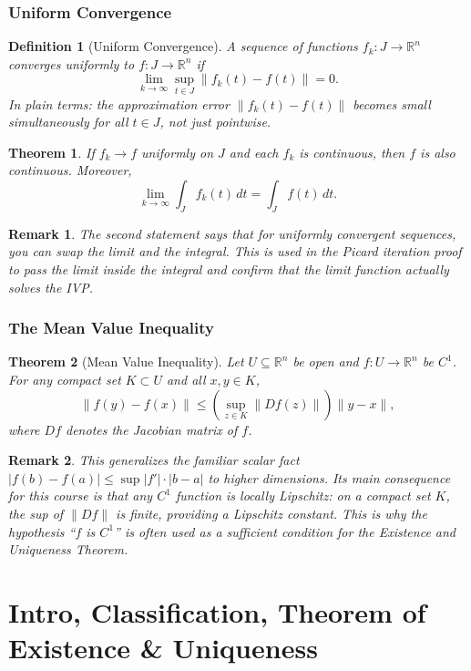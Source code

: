 \documentclass{article}
\newtheorem{theorem}{Theorem}
\newtheorem{definition}{Definition}
\newtheorem{remark}{Remark}
\newcommand{\R}{\mathbb{R}}
\begin{document}
\subsubsection{Uniform Convergence}
\begin{definition}[Uniform Convergence]
    A sequence of functions $f_k : J \to \R^n$ converges 
    \emph{uniformly} to $f : J \to \R^n$ if
    \[\lim_{k \to \infty} \sup_{t \in J} \|f_k(t) - f(t)\| = 0.\]
    In plain terms: the approximation error $\|f_k(t) - f(t)\|$ becomes 
    small \emph{simultaneously} for all $t \in J$, not just pointwise.
\end{definition}
\begin{theorem}
    If $f_k \to f$ uniformly on $J$ and each $f_k$ is continuous, then $f$ 
    is also continuous. Moreover,
    \[\lim_{k\to\infty}\int_J f_k(t)\,dt = \int_J f(t)\,dt.\]
\end{theorem}
\begin{remark}
    The second statement says that for uniformly convergent sequences, 
    you can swap the limit and the integral. This is used in the Picard 
    iteration proof to pass the limit inside the integral and confirm that 
    the limit function actually solves the IVP.
\end{remark}

\subsubsection{The Mean Value Inequality}
\label{MVI}
\begin{theorem}[Mean Value Inequality]
    Let $U \subseteq \R^n$ be open and $f : U \to \R^n$ 
    be $C^1$. For any compact set $K \subset U$ and all $x, y \in K$,
    \[\|f(y) - f(x)\| \leq \left(\sup_{z \in K}\|Df(z)\|\right)\|y - x\|,\]
    where $Df$ denotes the Jacobian matrix of $f$.
\end{theorem}
\begin{remark}
    This generalizes the familiar scalar fact $|f(b)-f(a)| \leq 
    \sup|f'|\cdot|b-a|$ to higher dimensions. Its main consequence for 
    this course is that any $C^1$ function is locally Lipschitz: on a 
    compact set $K$, the sup of $\|Df\|$ is finite, providing a Lipschitz 
    constant. This is why the hypothesis ``$f$ is $C^1$'' is often used 
    as a sufficient condition for the Existence and Uniqueness Theorem.
\end{remark}

\section{Intro, Classification, Theorem of Existence \& Uniqueness}
\end{document}
